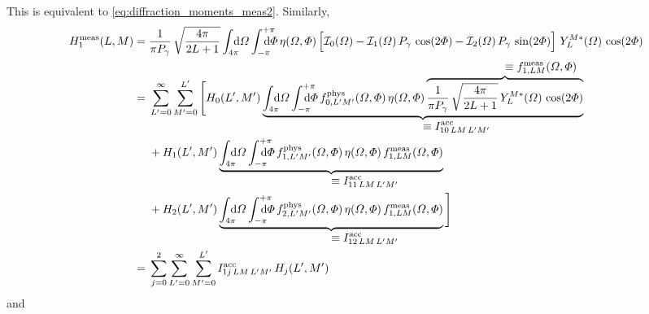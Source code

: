 This is equivalent to \cref{eq:diffraction_moments_meas2}.  Similarly,
\begin{align}
  H_1^\text{meas}(L, M)
  ={}& \frac{1}{\pi P_\gamma}\, \sqrt{\frac{4 \pi}{2 L + 1}} \int_{4 \pi}\!\!\!\! \dif{\Omega} \int_{-\pi}^{+\pi}\hspace{-1.2em} \dif{\Phi}\,
  \eta(\Omega, \Phi) \sBrk[2]{\intensity_0(\Omega)
  - \intensity_1(\Omega)\, P_\gamma\, \cos(2 \Phi)
  - \intensity_2(\Omega)\, P_\gamma\, \sin(2 \Phi)}\,
  Y_L^{M *}(\Omega)\, \cos(2 \Phi) \nonumber
  \\
  ={}& \sum_{L' = 0}^\infty \sum_{M' = 0}^{L'} \Bigg[
  H_0(L', M')\,
  \rdUnderbrace{\int_{4 \pi}\!\!\!\! \dif{\Omega} \int_{-\pi}^{+\pi}\hspace{-1.2em} \dif{\Phi}\,
  f_{0, L' M'}^\text{phys}(\Omega, \Phi)\,
  \eta(\Omega, \Phi)\,
  \rdOverbrace{\frac{1}{\pi P_\gamma}\, \sqrt{\frac{4 \pi}{2 L + 1}}\, Y_L^{M *}(\Omega)\, \cos(2 \Phi)}{\equiv f_{1, L M}^\text{meas}(\Omega, \Phi)}}%
  {\equiv I^\text{acc}_{1 0\, L M\, L' M'}} \nonumber
  \\
  & + H_1(L', M')\,
  \rdUnderbrace{\int_{4 \pi}\!\!\!\! \dif{\Omega} \int_{-\pi}^{+\pi}\hspace{-1.2em} \dif{\Phi}\,
  f_{1, L' M'}^\text{phys}(\Omega, \Phi)\,
  \eta(\Omega, \Phi)\,
  f_{1, L M}^\text{meas}(\Omega, \Phi)}%
  {\equiv I^\text{acc}_{1 1\, L M\, L' M'}} \nonumber
  \\
  & + H_2(L', M')\,
  \rdUnderbrace{\int_{4 \pi}\!\!\!\! \dif{\Omega} \int_{-\pi}^{+\pi}\hspace{-1.2em} \dif{\Phi}\,
  f_{2, L' M'}^\text{phys}(\Omega, \Phi)\,
  \eta(\Omega, \Phi)\,
  f_{1, L M}^\text{meas}(\Omega, \Phi)}%
  {\equiv I^\text{acc}_{1 2\, L M\, L' M'}}\, \Bigg] \nonumber
  \\
  \label{eq:photoprod_moment_1_meas2}
  ={}& \sum_{j = 0}^2 \sum_{L' = 0}^\infty \sum_{M' = 0}^{L'}
  I^\text{acc}_{1 j\, L M\, L' M'}\, H_j(L', M')
\end{align}
and
